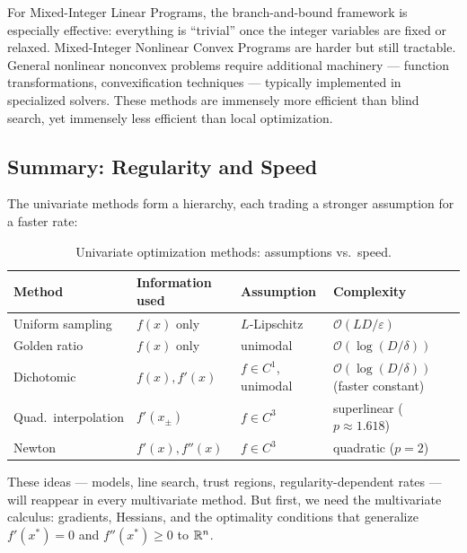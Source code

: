 For Mixed-Integer Linear Programs, the branch-and-bound framework is especially effective: everything is ``trivial'' once the integer variables are fixed or relaxed.
Mixed-Integer Nonlinear Convex Programs are harder but still tractable.
General nonlinear nonconvex problems require additional machinery --- function transformations, convexification techniques --- typically implemented in specialized solvers.
These methods are immensely more efficient than blind search, yet immensely less efficient than local optimization.


\subsection{Summary: Regularity and Speed}\label{ssec:univariate-summary}

The univariate methods form a hierarchy, each trading a stronger assumption for a faster rate:

\begin{table}[ht]
	\centering
	\begin{tabular}{llll}
		\toprule
		Method & Information used & Assumption & Complexity \\
		\midrule
		Uniform sampling & $f(x)$ only   & $L$-Lipschitz & $\mathcal{O}(LD/\varepsilon)$ \\
		Golden ratio     & $f(x)$ only   & unimodal      & $\mathcal{O}(\log(D/\delta))$ \\
		Dichotomic       & $f(x), f'(x)$ & $f \in C^1$, unimodal & $\mathcal{O}(\log(D/\delta))$ (faster constant) \\
		Quad.\ interpolation & $f'(x_\pm)$ & $f \in C^3$   & superlinear ($p \approx 1.618$) \\
		Newton           & $f'(x), f''(x)$ & $f \in C^3$ & quadratic ($p = 2$) \\
		\bottomrule
	\end{tabular}
	\caption{Univariate optimization methods: assumptions vs.\ speed.}
	\label{tab:univariate-methods}
\end{table}

These ideas --- models, line search, trust regions, regularity-dependent rates --- will reappear in every multivariate method.
But first, we need the multivariate calculus: gradients, Hessians, and the optimality conditions that generalize $f'(x^*) = 0$ and $f''(x^*) \geq 0$ to $\mathbb{R}^n$.